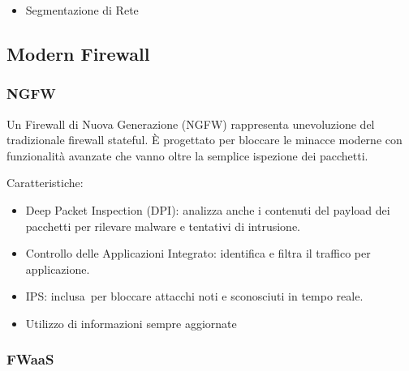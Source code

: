 \documentclass[
]{article}
\providecommand{\tightlist}{%
  \setlength{\itemsep}{0pt}\setlength{\parskip}{0pt}}
\begin{document}
{}

\begin{itemize}
\tightlist
\item
  {Segmentazione di Rete}
\end{itemize}

\subsection{\texorpdfstring{{Modern
Firewall}}{Modern Firewall}}\label{h.rdadqbv5ylu2}

\subsubsection{\texorpdfstring{{NGFW}}{NGFW}}\label{h.ifm6hte92hsh}

{Un Firewall di Nuova Generazione (NGFW) rappresenta
un\textquotesingle evoluzione del tradizionale firewall stateful. È
progettato per bloccare le minacce moderne con funzionalità avanzate che
vanno oltre la semplice ispezione dei pacchetti. }

{}

{Caratteristiche:}

\begin{itemize}
\tightlist
\item
  {Deep Packet Inspection (DPI)}{: analizza anche i contenuti del
  payload dei pacchetti per rilevare malware e tentativi di intrusione.}
\end{itemize}

{}

\begin{itemize}
\tightlist
\item
  {Controllo delle Applicazioni Integrato}{: identifica e filtra il
  traffico per applicazione.}
\end{itemize}

{}

\begin{itemize}
\tightlist
\item
  {IPS}{: inclusa}{~per bloccare attacchi noti e sconosciuti in tempo
  reale. }
\end{itemize}

{}

\begin{itemize}
\tightlist
\item
  {Utilizzo di informazioni sempre aggiornate}
\end{itemize}

{}

\subsubsection{\texorpdfstring{{FWaaS}}{FWaaS}}\label{h.ft8g98t5x7la}
\end{document}
